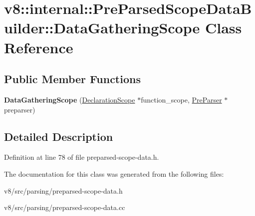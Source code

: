 \hypertarget{classv8_1_1internal_1_1PreParsedScopeDataBuilder_1_1DataGatheringScope}{}\section{v8\+:\+:internal\+:\+:Pre\+Parsed\+Scope\+Data\+Builder\+:\+:Data\+Gathering\+Scope Class Reference}
\label{classv8_1_1internal_1_1PreParsedScopeDataBuilder_1_1DataGatheringScope}
\subsection*{Public Member Functions}
\begin{DoxyCompactItemize}
\item 
\mbox{\label{classv8_1_1internal_1_1PreParsedScopeDataBuilder_1_1DataGatheringScope_ac30059790b2a9a145ce8e67f36167cbf}} 
{\bfseries Data\+Gathering\+Scope} (\mbox{\hyperlink{classv8_1_1internal_1_1DeclarationScope}{Declaration\+Scope}} $\ast$function\+\_\+scope, \mbox{\hyperlink{classv8_1_1internal_1_1PreParser}{Pre\+Parser}} $\ast$preparser)
\end{DoxyCompactItemize}


\subsection{Detailed Description}


Definition at line 78 of file preparsed-\/scope-\/data.\+h.



The documentation for this class was generated from the following files\+:\begin{DoxyCompactItemize}
\item 
v8/src/parsing/preparsed-\/scope-\/data.\+h\item 
v8/src/parsing/preparsed-\/scope-\/data.\+cc\end{DoxyCompactItemize}
